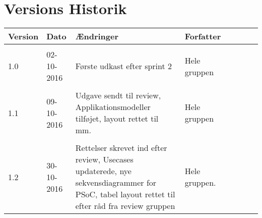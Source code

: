 \chapter{Versions Historik}

\begin{tabularx}{365pt}{ TX  TX  TX  TX }
\textbf{Version} & \textbf{Dato} & \textbf{Ændringer} & \textbf{Forfatter}\\\hline\\
1.0 & 02-10-2016 & Første udkast efter sprint 2 & Hele gruppen \\
\hline\\
1.1 & 09-10-2016 & Udgave sendt til review, Applikationsmodeller tilføjet, layout rettet til mm. & Hele gruppen \\
\hline\\
1.2 & 30-10-2016 & Rettelser skrevet ind efter review, Usecases updaterede, nye sekvensdiagrammer for PSoC, tabel layout rettet til efter råd fra review gruppen & Hele gruppen.
	
\end{tabularx}
\pagebreak